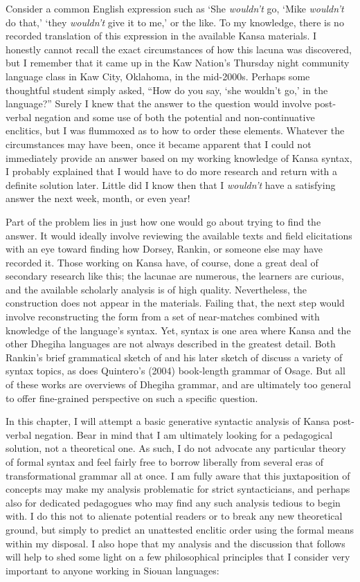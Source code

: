 \documentclass[output=paper]{LSP/langsci}
\begin{document}
Consider a common English expression such as `She \textit{wouldn't} go, `Mike \textit{wouldn't} do that,' `they \textit{wouldn't} give it to me,' or the like. To my knowledge, there is no recorded translation of this expression in the available Kansa materials. I honestly cannot recall the exact circumstances of how this lacuna was discovered, but I remember that it came up in the Kaw Nation's Thursday night community language class in Kaw City, Oklahoma, in the mid-2000s. Perhaps some thoughtful student simply asked, ``How do you say, `she wouldn't go,' in the language?'' Surely I knew that the answer to the question would involve post-verbal negation and some use of both the potential and non-continuative enclitics, but I was flummoxed as to how to order these elements. Whatever the circumstances may have been, once it became apparent that I could not immediately provide an answer based on my working knowledge of Kansa syntax, I probably explained that I would have to do more research and return with a definite solution later. Little did I know then that I \textit{wouldn't} have a satisfying answer the next week, month, or even year!

Part of the problem lies in just how one would go about trying to find the answer. It would ideally involve reviewing the available texts and field elicitations with an eye toward finding how Dorsey, Rankin, or someone else may have recorded it. Those working on Kansa have, of course, done a great deal of secondary research like this; the lacunae are numerous, the learners are curious, and the available scholarly analysis is of high quality. Nevertheless, the construction does not appear in the materials. Failing that, the next step would involve reconstructing the form from a set of near-matches combined with knowledge of the language's syntax. Yet, syntax is one area where Kansa and the other Dhegiha languages are not always described in the greatest detail. Both Rankin's brief grammatical sketch of \citet{Kansa1989} and his later sketch of \citet{Quapaw2005} discuss a variety of syntax topics, as does Quintero's (2004) book-length grammar of Osage. But all of these works are overviews of Dhegiha grammar, and are ultimately too general to offer fine-grained perspective on such a specific question. 

In this chapter, I will attempt a basic generative syntactic analysis of Kansa post-verbal negation. Bear in mind that I am ultimately looking for a pedagogical solution, not a theoretical one. As such, I do not advocate any particular theory of formal syntax and feel fairly free to borrow liberally from several eras of transformational grammar all at once. I am fully aware that this juxtaposition of concepts may make my analysis problematic for strict syntacticians, and perhaps also for dedicated pedagogues who may find any such analysis tedious to begin with. I do this not to alienate potential readers or to break any new theoretical ground, but simply to predict an unattested enclitic order using the formal means within my disposal. I also hope that my analysis and the discussion that follows will help to shed some light on a few philosophical principles that I consider very important to anyone working in Siouan languages:
\end{document}
